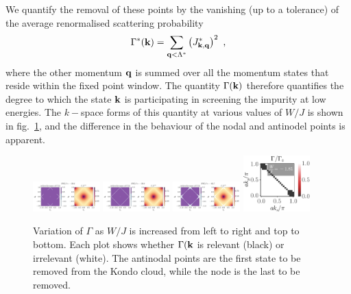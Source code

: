 \documentclass[reprint,hidelinks,onecolumn]{revtex4-2}
\begin{document}
We quantify the removal of these points by the vanishing (up to a tolerance) of the average renormalised scattering probability 
\begin{equation}\begin{aligned}
	\Gamma^*({\bf k}) = \sum_{{\bf q} < \Lambda^*} \left(J^*_{{\bf k}, {\bf q}}\right)^2~,
\end{aligned}\end{equation}
where the other momentum \({\bf q}\) is summed over all the momentum states that reside within the fixed point window. The quantity \(\Gamma({\bf k})\) therefore quantifies the degree to which the state \({\bf k}\) is participating in screening the impurity at low energies. The \(k-\)space forms of this quantity at various values of \(W/J\) is shown in fig.~\ref{gamma_kxky}, and the difference in the behaviour of the nodal and antinodel points is apparent. 

\begin{figure}[!htpb]
	\centering
	\includegraphics[width=0.23\textwidth]{scattProb-3.pdf}
	\includegraphics[width=0.23\textwidth]{scattProb-5.pdf}
	\includegraphics[width=0.23\textwidth]{scattProb-6.pdf}
	\includegraphics[width=0.23\textwidth]{scattProb-7.pdf}
	\caption{Variation of \(\Gamma\) as \(W/J\) is increased from left to right and top to bottom. Each plot shows whether \(\Gamma({\bf k}\) is relevant (black) or irrelevant (white). The antinodal points are the first state to be removed from the Kondo cloud, while the node is the last to be removed.}
	\label{gamma_kxky}
\end{figure}
\end{document}

